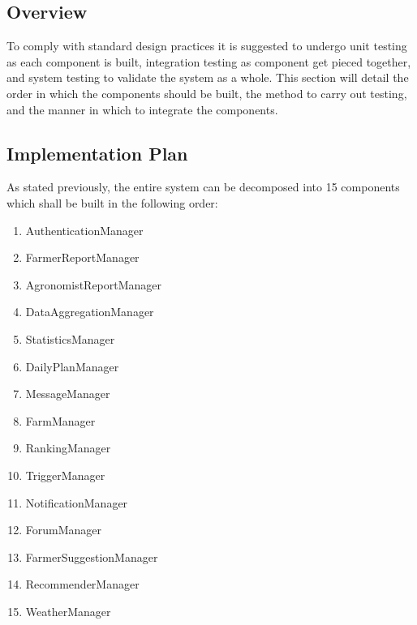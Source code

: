 

\subsection{Overview}
\begin{flushleft}
To comply with standard design practices it is suggested to undergo unit testing as each component is built, integration testing as component get pieced together, and system testing to validate the system as a whole. This section will detail the order in which the components should be built, the method to carry out testing, and the manner in which to integrate the components.
\end{flushleft}

 
\subsection{Implementation Plan}
\begin{flushleft}
As stated previously, the entire system can be decomposed into 15 components which shall be built in the following order: 
\end{flushleft}

\begin{enumerate}
\item AuthenticationManager
\item FarmerReportManager
\item AgronomistReportManager
\item DataAggregationManager
\item StatisticsManager
\item DailyPlanManager
\item MessageManager
\item FarmManager
\item RankingManager
\item TriggerManager
\item NotificationManager
\item ForumManager
\item FarmerSuggestionManager
\item RecommenderManager
\item WeatherManager
\end{enumerate}

